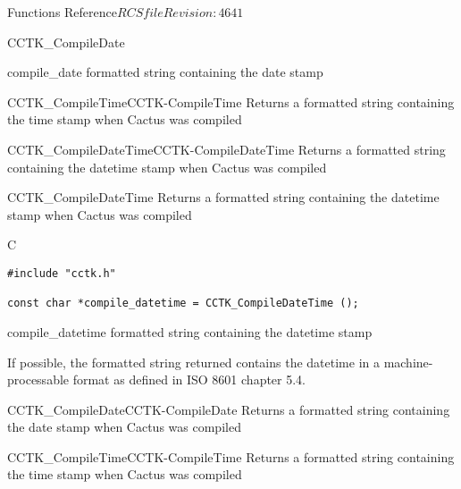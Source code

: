 \begin{cactuspart}{ Functions Reference}{$RCSfile$}{$Revision: 4641 $}
\begin{FunctionDescription}{CCTK\_CompileDate}
\begin{ResultSection}
\begin{Result}{compile\_date}
formatted string containing the date stamp
\end{Result}
\end{ResultSection}

\begin{SeeAlsoSection}
\begin{SeeAlso2}{CCTK\_CompileTime}{CCTK-CompileTime}
  Returns a formatted string containing the time stamp when Cactus was compiled
\end{SeeAlso2}
\begin{SeeAlso2}{CCTK\_CompileDateTime}{CCTK-CompileDateTime}
  Returns a formatted string containing the datetime stamp when Cactus was compiled
\end{SeeAlso2}
\end{SeeAlsoSection}
\end{FunctionDescription}


\begin{FunctionDescription}{CCTK\_CompileDateTime}
\label{CCTK-CompileDateTime}
Returns a formatted string containing the datetime stamp when Cactus was compiled

\begin{SynopsisSection}
\begin{Synopsis}{C}
\begin{verbatim}
#include "cctk.h"

const char *compile_datetime = CCTK_CompileDateTime ();
\end{verbatim}
\end{Synopsis}
\end{SynopsisSection}

\begin{ResultSection}
\begin{Result}{compile\_datetime}
formatted string containing the datetime stamp
\end{Result}
\end{ResultSection}

\begin{Discussion}
If possible, the formatted string returned contains the datetime in a
machine-processable format as defined in ISO 8601 chapter 5.4.
\end{Discussion}

\begin{SeeAlsoSection}
\begin{SeeAlso2}{CCTK\_CompileDate}{CCTK-CompileDate}
  Returns a formatted string containing the date stamp when Cactus was compiled
\end{SeeAlso2}
\begin{SeeAlso2}{CCTK\_CompileTime}{CCTK-CompileTime}
  Returns a formatted string containing the time stamp when Cactus was compiled
\end{SeeAlso2}
\end{SeeAlsoSection}
\end{FunctionDescription}


\end{cactuspart}
